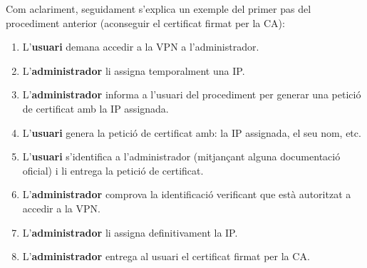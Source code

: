 Com aclariment, seguidament s'explica un exemple del primer pas del procediment anterior (aconseguir el certificat firmat per la CA):
\begin{enumerate}
\item L'\textbf{usuari} demana accedir a la VPN a l'administrador.
\item L'\textbf{administrador} li assigna temporalment una IP.
\item L'\textbf{administrador} informa a l'usuari del procediment per generar una petició de certificat amb la IP assignada.
\item L'\textbf{usuari} genera la petició de certificat amb: la IP assignada, el seu nom, etc.
\item L'\textbf{usuari} s'identifica a l'administrador (mitjançant alguna documentació oficial) i li entrega la petició de certificat.
\item L'\textbf{administrador} comprova la identificació verificant que està autoritzat a accedir a la VPN.
\item L'\textbf{administrador} li assigna definitivament la IP.
\item L'\textbf{administrador} entrega al usuari el certificat firmat per la CA.
\end{enumerate}
